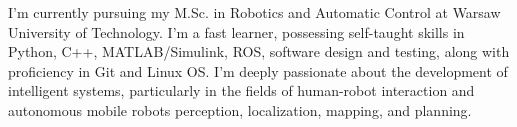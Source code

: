 

\begin{cvparagraph}

I’m currently pursuing my M.Sc. in Robotics and Automatic Control at Warsaw University of Technology. I’m a fast learner, possessing self-taught skills in Python, C++, MATLAB/Simulink, ROS, software design and testing, along with proficiency in Git and Linux OS. I’m deeply passionate about the development of intelligent systems, particularly in the fields of human-robot interaction and autonomous mobile robots perception, localization, mapping, and planning.
\end{cvparagraph}
